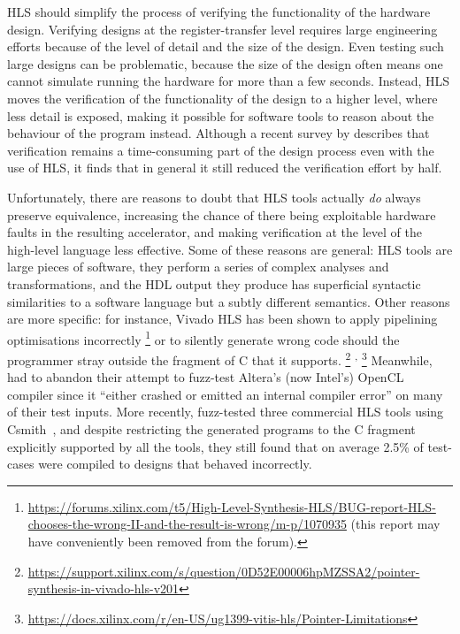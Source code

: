 \Gls{HLS} should simplify the process of verifying the functionality of the
hardware design.  Verifying designs at the register-transfer level requires
large engineering efforts because of the level of detail and the size of the
design.  Even testing such large designs can be problematic, because the size of
the design often means one cannot simulate running the hardware for more than a
few seconds.  Instead, \gls{HLS} moves the verification of the functionality of
the design to a higher level, where less detail is exposed, making it possible
for software tools to reason about the behaviour of the program
instead. Although a recent survey by \textcite{lahti19_are_we_there_yet}
describes that verification remains a time-consuming part of the design process
even with the use of \gls{HLS}, it finds that in general it still reduced the
verification effort by half.

Unfortunately, there are reasons to doubt that \gls{HLS} tools actually
\emph{do} always preserve equivalence, increasing the chance of there being
exploitable hardware faults in the resulting accelerator, and making
verification at the level of the high-level language less effective.  Some of
these reasons are general: \gls{HLS} tools are large pieces of software, they
perform a series of complex analyses and transformations, and the \gls{HDL}
output they produce has superficial syntactic similarities to a software
language but a subtly different semantics.  Other reasons are more specific: for
instance, Vivado HLS has been shown to apply pipelining optimisations
incorrectly%
\footnote{\url{https://forums.xilinx.com/t5/High-Level-Synthesis-HLS/BUG-report-HLS-chooses-the-wrong-II-and-the-result-is-wrong/m-p/1070935}
  (this report may have conveniently been removed from the forum).}  or to
silently generate wrong code should the programmer stray outside the fragment of
C that it supports.%
\footnote{\url{https://support.xilinx.com/s/question/0D52E00006hpMZSSA2/pointer-synthesis-in-vivado-hls-v201}}%
\textsuperscript{,}%
\footnote{\url{https://docs.xilinx.com/r/en-US/ug1399-vitis-hls/Pointer-Limitations}}
Meanwhile, \textcite{lidbury15_many_core_compil_fuzzin} had to abandon their
attempt to fuzz-test Altera's (now Intel's) OpenCL compiler since it
\enquote{either crashed or emitted an internal compiler error} on many of their
test inputs.  More recently, \textcite{herklotz21_esrhlst} fuzz-tested three
commercial \gls{HLS} tools using
Csmith~\cite{yang11_findin_under_bugs_c_compil}, and despite restricting the
generated programs to the C fragment explicitly supported by all the tools, they
still found that on average 2.5\% of test-cases were compiled to designs that
behaved incorrectly.

